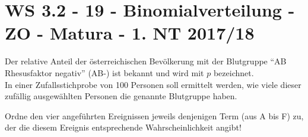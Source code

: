 \section{WS 3.2 - 19 - Binomialverteilung - ZO - Matura - 1. NT 2017/18}

\begin{beispiel}[WS 3.2]{1}
Der relative Anteil der österreichischen Bevölkerung mit der Blutgruppe "`AB Rhesusfaktor negativ"' (AB-) ist bekannt und wird mit $p$ bezeichnet.\\
In einer Zufallsstichprobe von 100 Personen soll ermittelt werden, wie viele dieser zufällig ausgewählten Personen die genannte Blutgruppe haben.

Ordne den vier angeführten Ereignissen jeweils denjenigen Term (aus A bis F) zu, der die diesem Ereignis entsprechende Wahrscheinlichkeit angibt!

\end{beispiel}